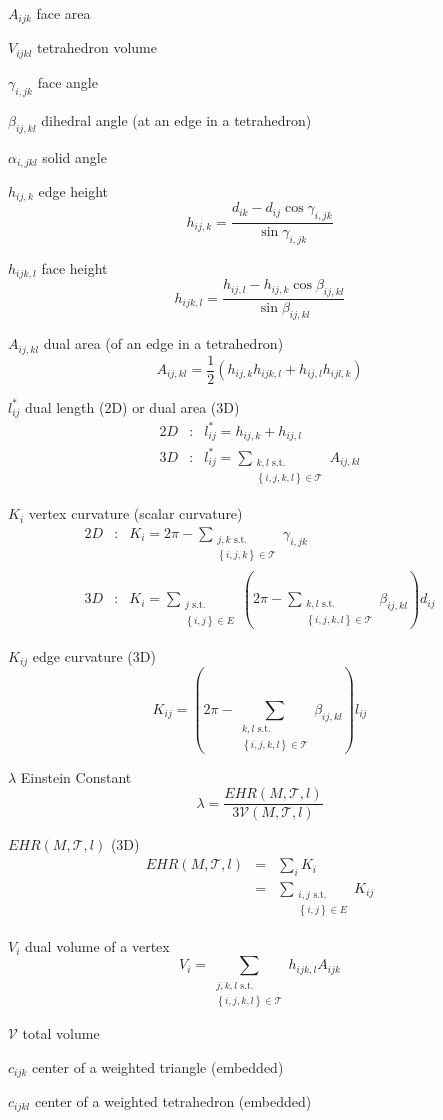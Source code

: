 \documentclass{article}
\begin{document}
$A_{ijk}$ face area

$V_{ijkl}$ tetrahedron volume

$\gamma _{i,jk}$ face angle

$\beta _{ij,kl}$ dihedral angle (at an edge in a tetrahedron)

$\alpha _{i,jkl}$ solid angle

$h_{ij,k}$ edge height%
\[
h_{ij,k}=\frac{d_{ik}-d_{ij}\cos \gamma _{i,jk}}{\sin \gamma _{i,jk}}
\]

$h_{ijk,l}$ face height%
\[
h_{ijk,l}=\frac{h_{ij,l}-h_{ij,k}\cos \beta _{ij,kl}}{\sin \beta _{ij,kl}}
\]

$A_{ij,kl}$ dual area (of an edge in a tetrahedron)%
\[
A_{ij,kl}=\frac{1}{2}\left( h_{ij,k}h_{ijk,l}+h_{ij,l}h_{ijl,k}\right) 
\]

$l_{ij}^{\ast }$ dual length (2D) or dual area (3D) 
\begin{eqnarray*}
2D &:&l_{ij}^{\ast }=h_{ij,k}+h_{ij,l} \\
3D &:&l_{ij}^{\ast }=\sum_{\substack{ k,l\text{ s.t.} \\ \left\{
i,j,k,l\right\} \in \mathcal{T}}}A_{ij,kl}
\end{eqnarray*}

$K_{i}$ vertex curvature (scalar curvature)%
\begin{eqnarray*}
2D &:&K_{i}=2\pi -\sum_{\substack{ j,k\text{ s.t.} \\ \left\{ i,j,k\right\}
\in \mathcal{T}}}\gamma _{i,jk} \\
3D &:&K_{i}=\sum_{\substack{ j\text{ s.t.} \\ \left\{ i,j\right\} \in E}}%
\left( 2\pi -\sum_{\substack{ k,l\text{ s.t.} \\ \left\{ i,j,k,l\right\} \in 
\mathcal{T}}}\beta _{ij,kl}\right) d_{ij}
\end{eqnarray*}

$K_{ij}$ edge curvature (3D)%
\[
K_{ij}=\left( 2\pi -\sum_{\substack{ k,l\text{ s.t.} \\ \left\{
i,j,k,l\right\} \in \mathcal{T}}}\beta _{ij,kl}\right) l_{ij}
\]

$\lambda $ Einstein Constant%
\[
\lambda =\frac{EHR\left( M,\mathcal{T},l\right) }{3\mathcal{V}\left( M,%
\mathcal{T},l\right) }
\]

$EHR\left( M,\mathcal{T},l\right) $ (3D)%
\begin{eqnarray*}
EHR\left( M,\mathcal{T},l\right)  &=&\sum_{i}K_{i} \\
&=&\sum_{\substack{ i,j\text{ s.t.} \\ \left\{ i,j\right\} \in E}}K_{ij}
\end{eqnarray*}

$V_{i}$ dual volume of a vertex%
\[
V_{i}=\sum_{\substack{ j,k,l\text{ s.t.} \\ \left\{ i,j,k,l\right\} \in 
\mathcal{T}}}h_{ijk,l}A_{ijk}
\]

$\mathcal{V}$ total volume

$c_{ijk}$ center of a weighted triangle (embedded)

$c_{ijkl}$ center of a weighted tetrahedron (embedded)
\end{document}
